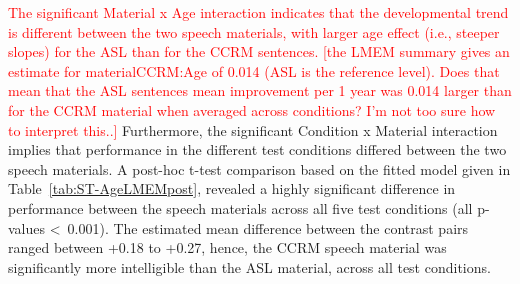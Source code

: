 \documentclass[a4paper, twoside]{templates/ociamthesis}
\begin{document}
\textcolor{red}{The significant Material x Age interaction indicates that the developmental trend is different between the two speech materials, with larger age effect (i.e., steeper slopes) for the ASL than for the CCRM sentences. [the LMEM summary gives an estimate for materialCCRM:Age of 0.014 (ASL is the reference level). Does that mean that the ASL sentences mean improvement per 1 year was 0.014 larger than for the CCRM material when averaged across conditions? I'm not too sure how to interpret this..]} Furthermore, the significant Condition x Material interaction implies that performance in the different test conditions differed between the two speech materials. A post-hoc t-test comparison based on the fitted model given in Table~\ref{tab:ST-AgeLMEMpost}, revealed a highly significant difference in performance between the speech materials across all five test conditions (all p-values \textless~0.001). The estimated mean difference between the contrast pairs ranged between +0.18 to +0.27, hence, the CCRM speech material was significantly more intelligible than the ASL material, across all test conditions.\\
\end{document}
